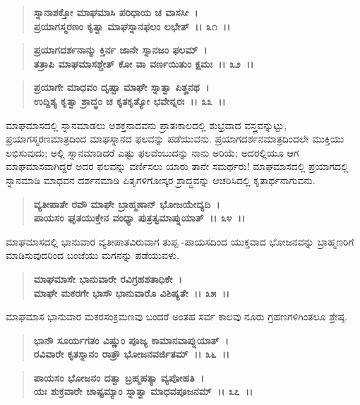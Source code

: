 \begin{verse}
\textbf{ಸ್ನಾನಾಶಕ್ತೋ ಮಾಘಮಾಸಿ ಪರಿಧಾಯ ಚ ವಾಸಸೀ~।}\\\textbf{ಪ್ರಯಾಗಸ್ಮರಣಂ ಕೃತ್ವಾ ಮಾಘಸ್ನಾನಫಲಂ ಲಭೇತ್~।। ೩೧~।। }
\end{verse}

\begin{verse}
\textbf{ಪ್ರಯಾಗದರ್ಶನಾನ್ಮು ಕ್ತಿರ್ನ ಜಾನೇ ಸ್ನಾನಜಂ ಫಲಮ್~।}\\\textbf{ತತ್ರಾಪಿ ಮಾಘಮಾಸಶ್ಚೇತ್ ಕೋ ವಾ ವರ್ಣಯಿತುಂ ಕ್ಷಮಃ~।। ೩೨~।। }
\end{verse}

\begin{verse}
\textbf{ಪ್ರಯಾಗೇ ಮಾಧವಂ ದೃಷ್ಟಾ ಮಾಘೇ ಸ್ನಾತ್ವಾ ಪಿತೄನಥ~।}\\\textbf{ಉದ್ದಿಶ್ಯ ಕೃತ್ವಾ ಶ್ರಾದ್ಧಂ ಚ ಕೃತಕೃತ್ಯೋ ಭವೇನ್ನರಃ~।। ೩೩~।।}
\end{verse}

ಮಾಘಮಾಸದಲ್ಲಿ ಸ್ನಾನಮಾಡಲು ಅಶಕ್ತನಾದವನು ಪ್ರಾತಃಕಾಲದಲ್ಲಿ ಶುಭ್ರವಾದ ವಸ್ತ್ರವನ್ನುಟ್ಟು, ಪ್ರಯಾಗಸ್ಮರಣಮಾತ್ರದಿಂದ ಮಾಘಸ್ನಾನದ ಫಲವನ್ನು ಪಡೆಯುವನು. ಪ್ರಯಾಗದರ್ಶನಮಾತ್ರದಿಂದಲೇ ಮುಕ್ತಿಯು ಲಭಿಸುವುದು; ಅಲ್ಲಿ ಸ್ನಾನಮಾಡಿದರೆ ಎಷ್ಟು ಫಲವೆಂಬುದನ್ನು ನಾನು ಅರಿಯೆ; ಅದರಲ್ಲಿಯೂ ಆಗ ಮಾಘಮಾಸವಾಗಿದ್ದರೆ ಅದರ ಫಲವನ್ನು ವರ್ಣಿಸಲು ಯಾರು ತಾನೇ ಸಮರ್ಥರು! ಮಾಘಮಾಸದಲ್ಲಿ ಪ್ರಯಾಗದಲ್ಲಿ ಸ್ನಾನಮಾಡಿ ಮಾಧವನ ದರ್ಶನಮಾಡಿ ಪಿತೃಗಳಿಗೋಸ್ಕರ ಶ್ರಾದ್ಧವನ್ನು ಆಚರಿಸಿದಲ್ಲಿ ಕೃತಾರ್ಥನಾಗುವನು.

\begin{verse}
\textbf{ವ್ಯತೀಪಾತೇ ರವೌ ಮಾಘೇ ಬ್ರಾಹ್ಮಣಾನ್ ಭೋಜಯೇದ್ಯದಿ~।}\\\textbf{ಪಾಯಸಂ ಘೃತಯುಕ್ತೇನ ವಂಧ್ಯಾ ಪುತ್ರತ್ವಮಾಪ್ನುಯಾತ್~।। ೩೪~।।}
\end{verse}

ಮಾಘಮಾಸದಲ್ಲಿ ಭಾನುವಾರ ವ್ಯತೀಪಾತವಿರುವಾಗ ತುಪ್ಪ -ಪಾಯಸದಿಂದ ಯುಕ್ತವಾದ ಭೋಜನವನ್ನು ಬ್ರಾಹ್ಮಣರಿಗೆ ಮಾಡಿಸುವುದರಿಂದ ಬಂಜೆಯು ಮಗನನ್ನು ಪಡೆಯುವಳು.

\begin{verse}
\textbf{ಮಾಘಮಾಸೇ ಭಾನುವಾರೇ ರವಿಗ್ರಹಶತಾಧಿಕೇ~।}\\\textbf{ಮಾಘೇ ಮಕರಗೇ ಭಾಸೌ ಭಾನುವಾರೊ ವಿಶಿಷ್ಯತೇ~।। ೩೫~।।}
\end{verse}

ಮಾಘಮಾಸ ಭಾನುವಾರ ಮಕರಸಂಕ್ರಮಣವು ಬಂದರೆ ಅಂತಹ ಸರ್ವ ಕಾಲವು ನೂರು ಗ್ರಹಣಗಳಿಗಿಂತಲೂ ಶ್ರೇಷ್ಠ.

\begin{verse}
\textbf{ಭಾನೌ ಸೂರ್ಯಗತಂ ವಿಷ್ಣುಂ ಪೂಜ್ಯ ಕಾಮಾನವಾಪ್ನುಯಾತ್~।}\\\textbf{ರವಿವಾರೇ ಕೃತಸ್ನಾನಂ ರಾತ್ರೌ ಭೋಜನವರ್ಜಿತಮ್~।। ೩೬~।।} 
\end{verse}

\begin{verse}
\textbf{ಪಾಯಸಂ ಭೋಜನಂ ದತ್ವಾ ಬ್ರಹ್ಮಹತ್ಯಾ ವ್ಯಪೋಹತಿ~।}\\\textbf{ಯಃ ಶುಕ್ರವಾರೇ ಚಾಷ್ಟಮ್ಯಾಂ ಸ್ನಾತ್ವಾ ಮಾಧವಪೂಜನಮ್~।। ೩೭~।। }
\end{verse}

